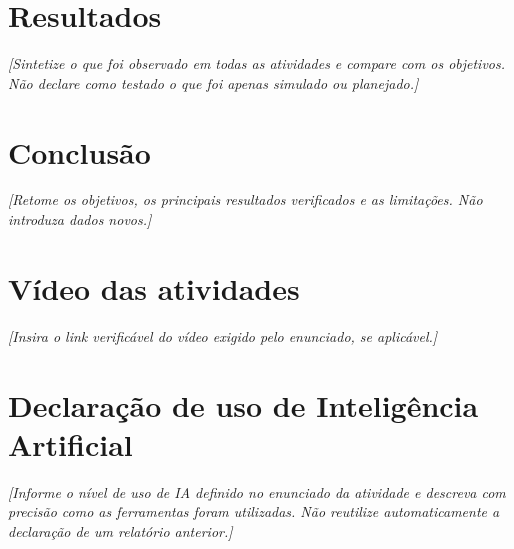 \documentclass[12pt,a4paper]{article}
\begin{document}
\section{Resultados}
\textit{[Sintetize o que foi observado em todas as atividades e compare com os objetivos. Não declare como testado o que foi apenas simulado ou planejado.]}

\section{Conclusão}
\textit{[Retome os objetivos, os principais resultados verificados e as limitações. Não introduza dados novos.]}

\section{Vídeo das atividades}
\textit{[Insira o link verificável do vídeo exigido pelo enunciado, se aplicável.]}

\section{Declaração de uso de Inteligência Artificial}
\textit{[Informe o nível de uso de IA definido no enunciado da atividade e descreva com precisão como as ferramentas foram utilizadas. Não reutilize automaticamente a declaração de um relatório anterior.]}
\end{document}
